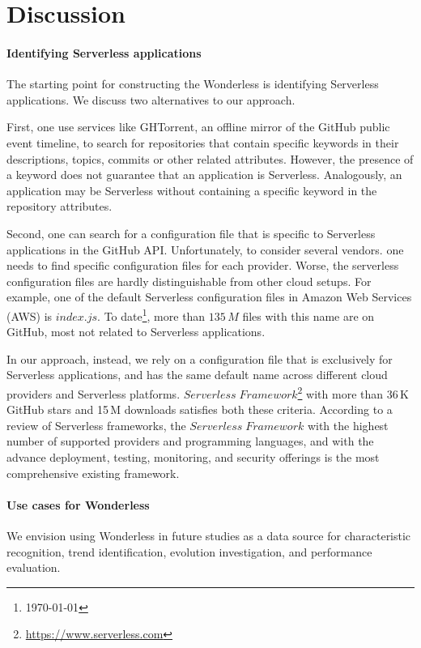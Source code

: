 
\section{Discussion}
\label{discussion}

\paragraph{Identifying Serverless applications}
The starting point for constructing the Wonderless is identifying Serverless 
applications. We discuss two alternatives to our approach.

First, one use services like GHTorrent\cite{gousios2012ghtorrent}, 
an offline mirror of the GitHub public event timeline, to search for repositories 
that contain specific keywords in their descriptions, topics, commits or other 
related attributes. However, the presence of a keyword does not guarantee 
that an application is Serverless. Analogously, an application may be Serverless 
without containing a specific keyword in the repository attributes.

Second, one can search for a configuration file that is 
specific to Serverless applications in the GitHub API. Unfortunately, to consider several vendors. 
one needs to find specific configuration files for each provider.
Worse, the serverless configuration files are hardly distinguishable from other cloud setups. 
For example, one of the default Serverless configuration files in Amazon 
Web Services\,(AWS) is $index.js$. To date\footnote{\today}, 
more than $135 \, M$ files with this name are on GitHub, most not 
related to Serverless applications. 

In our approach, instead, we rely on a configuration file that is exclusively 
for Serverless applications, and has the same default name across 
different cloud providers and Serverless platforms. 
$Serverless \; Framework$\footnote{\url{https://www.serverless.com}} 
with more than 36\,K GitHub stars and 15\,M downloads satisfies both these 
criteria. According to a review of Serverless frameworks\cite{kritikos2018review}, 
the $Serverless \; Framework$ with the highest number of supported providers 
and programming languages, and with the advance deployment, testing, 
monitoring, and security offerings is the most comprehensive existing framework. 


\paragraph{Use cases for Wonderless}
We envision using Wonderless in future studies as a data source for characteristic recognition, 
trend identification, evolution investigation, and performance evaluation.

